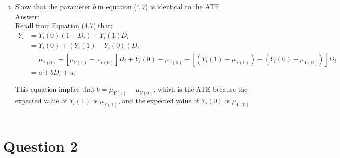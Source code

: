 \documentclass[11pt,notitlepage]{article}\usepackage[]{graphicx}\usepackage[]{color}
\makeatletter
\newenvironment{kframe}{%
 \def\at@end@of@kframe{}%
 \ifinner\ifhmode%
  \def\at@end@of@kframe{\end{minipage}}%
  \begin{minipage}{\columnwidth}%
 \fi\fi%
 \def\FrameCommand##1{\hskip\@totalleftmargin \hskip-\fboxsep
 \colorbox{shadecolor}{##1}\hskip-\fboxsep
     \hskip-\linewidth \hskip-\@totalleftmargin \hskip\columnwidth}%
 \MakeFramed {\advance\hsize-\width
   \@totalleftmargin\z@ \linewidth\hsize
   \@setminipage}}%
 {\par\unskip\endMakeFramed%
 \at@end@of@kframe}
\newenvironment{knitrout}{}{} %
\makeatother
\begin{document}
\begin{enumerate}[a)]
\item Show that the parameter $b$ in equation (4.7) is identical to the ATE.\\
Answer:\\
Recall from Equation (4.7) that:
\begin{align*}
Y_i & =Y_i (0)(1-D_i )+Y_i (1) D_i\\
&=Y_i (0)+(Y_i (1)-Y_i (0) )D_i\\
&= \mu_{Y(0)}+[\mu_{Y(1)}-\mu_{Y(0)} ] D_i+Y_i (0)-\mu_{Y(0)}+[(Y_i (1)-\mu_{Y(1)} )-(Y_i (0)-\mu_{Y(0)} )] D_i\\
&= a+bD_i+u_i
\end{align*}

This equation implies that $b=\mu_{Y(1)}-\mu_{Y(0)}$, which is the ATE because the expected value of $Y_i (1)$ is $\mu_{Y(1)}$, and the expected value of $Y_i (0)$ is $\mu_{Y(0)}$.

\end{enumerate}

\section*{Question 2}

\begin{knitrout}
\color{fgcolor}\begin{kframe}
\begin{verbatim}






\end{verbatim}
\end{kframe}
\end{knitrout}
\end{document}
